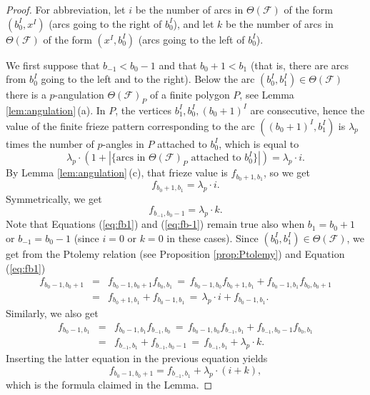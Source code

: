 \documentclass[11pt,a4paper]{amsart}
\theoremstyle{definition}
\numberwithin{equation}{section}
\begin{document}
\begin{proof}
For abbreviation, let $i$ be the number of arcs in $\Theta(\mathcal{F})$ of the form $(b_0^I,x^I)$
(arcs going to the right of $b_0^I$), 
and let $k$ be the number of arcs in $\Theta(\mathcal{F})$ of the form $(x^I,b_0^I)$
(arcs going to the left of $b_0^I$). 

We first suppose that $b_{-1}<b_0-1$ and that $b_0+1<b_1$ (that is, there are arcs from $b_0^I$
going to the left and to the right). Below the arc $(b_0^I,b_1^I)\in \Theta(\mathcal{F})$ there is a 
$p$-angulation $\Theta(\mathcal{F})_P$ of a finite polygon $P$, see Lemma \ref{lem:angulation}\,(a).
In $P$, the vertices $b_1^I, b_0^I,(b_0+1)^I$ are consecutive, hence the value of the
finite frieze pattern corresponding to the arc $((b_0+1)^I, b_1^I)$ is $\lambda_p$ times the number of 
$p$-angles in $P$ attached to $b_0^I$, which is equal to
$$\lambda_p\cdot (1+ |\{\text{arcs in $\Theta(\mathcal{F})_P$ attached to $b_0^I$}\}|)
= \lambda_p\cdot i.
$$
By Lemma \ref{lem:angulation}\,(c), that frieze value is $f_{b_0+1,b_1}$, so we get
\begin{equation} \label{eq:fb1}
f_{b_0+1,b_1} = \lambda_p\cdot i.
\end{equation}
Symmetrically, we get
\begin{equation} \label{eq:fb-1}
f_{b_{-1},b_0-1} = \lambda_p\cdot k.
\end{equation}
Note that Equations (\ref{eq:fb1}) and (\ref{eq:fb-1}) remain true also when 
$b_1=b_0+1$ or $b_{-1}=b_0-1$ (since $i=0$ or $k=0$ in these cases).
Since $(b_0^I,b_1^I)\in \Theta(\mathcal{F})$, we get from the Ptolemy relation (see Proposition \ref{prop:Ptolemy}) and Equation (\ref{eq:fb1}) 
\begin{eqnarray*}
f_{b_0-1,b_0+1} & = & f_{b_0-1,b_0+1} f_{b_0,b_1} \,=\, f_{b_0-1,b_0} f_{b_0+1,b_1} + f_{b_0-1,b_1}f_{b_0,b_0+1} \\
& = & f_{b_0+1,b_1}+ f_{b_0-1,b_1}\,=\, \lambda_p\cdot i + f_{b_0-1,b_1}.
\end{eqnarray*}
Similarly, we also get
\begin{eqnarray*}
f_{b_0-1,b_1} & = & f_{b_0-1,b_1}f_{b_{-1},b_0} \,=\, f_{b_0-1,b_0}f_{b_{-1},b_1} +f_{b_{-1},b_0-1}f_{b_0,b_1} \\
& = & f_{b_{-1},b_1}+f_{b_{-1},b_0-1} \,=\, f_{b_{-1},b_1}+ \lambda_p\cdot k.
\end{eqnarray*}
Inserting the latter equation in the previous equation yields
$$f_{b_0-1,b_0+1} = f_{b_{-1},b_1}+ \lambda_p\cdot (i+k),
$$
which is the formula claimed in the Lemma. 
\end{proof}
\end{document}
